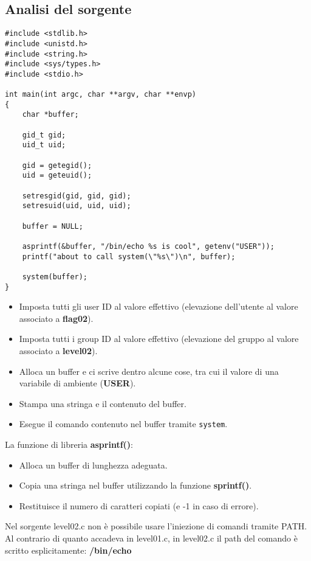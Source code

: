 \subsection{Analisi del sorgente}
\begin{lstlisting}[style=cstyle]
#include <stdlib.h>
#include <unistd.h>
#include <string.h>
#include <sys/types.h>
#include <stdio.h>

int main(int argc, char **argv, char **envp)
{
    char *buffer;

    gid_t gid;
    uid_t uid;

    gid = getegid();
    uid = geteuid();

    setresgid(gid, gid, gid);
    setresuid(uid, uid, uid);

    buffer = NULL;

    asprintf(&buffer, "/bin/echo %s is cool", getenv("USER"));
    printf("about to call system(\"%s\")\n", buffer);

    system(buffer);
}
\end{lstlisting}
\begin{itemize}
    \item Imposta tutti gli user ID al valore effettivo (elevazione dell’utente al valore associato a \textbf{flag02}).
    \item Imposta tutti i group ID al valore effettivo (elevazione del gruppo al valore associato a \textbf{level02}).
    \item Alloca un buffer e ci scrive dentro alcune cose, tra cui il valore di una variabile di ambiente (\textbf{USER}).
    \item Stampa una stringa e il contenuto del buffer.
    \item Esegue il comando contenuto nel buffer tramite \texttt{system}.
\end{itemize}
La funzione di libreria \textbf{asprintf()}:
\begin{itemize}
    \item Alloca un buffer di lunghezza adeguata.
    \item Copia una stringa nel buffer utilizzando la funzione \textbf{sprintf()}.
    \item Restituisce il numero di caratteri copiati (e -1 in caso di errore).
\end{itemize}
Nel sorgente level02.c non è possibile usare l’iniezione di comandi tramite PATH. Al contrario di quanto accadeva in level01.c, in level02.c il path del comando è scritto esplicitamente: \textbf{/bin/echo}

